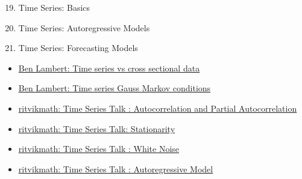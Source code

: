 \documentclass[12pt, titlepage, french]{report}
\begin{document}
\begin{ASM_chapter}
\begin{enumerate}
  \setcounter{enumi}{18}
	\item	Time Series: Basics
	\item	Time Series: Autoregressive Models
	\item	Time Series: Forecasting Models
\end{enumerate}
\end{ASM_chapter}

\begin{YTB_vids}
\begin{itemize}
	\item	\href{https://www.youtube.com/watch?v=-gmlyRRscXo}{Ben Lambert: Time series vs cross sectional data}
	\item	\href{https://www.youtube.com/watch?v=bWo_ka37szw&list=PLvo9ZnEQG5oXC-cg8ecXr6SJZWprEL1UC&index=3}{Ben Lambert: Time series Gauss Markov conditions}
	\item	\href{https://www.youtube.com/watch?v=DeORzP0go5I&list=PLvcbYUQ5t0UHOLnBzl46_Q6QKtFgfMGc3&index=14}{ritvikmath: Time Series Talk : Autocorrelation and Partial Autocorrelation}
	\item	\href{https://www.youtube.com/watch?v=oY-j2Wof51c&list=PLvcbYUQ5t0UHOLnBzl46_Q6QKtFgfMGc3&index=6}{ritvikmath: Time Series Talk: Stationarity}
	\item	\href{https://www.youtube.com/watch?v=cr4zIXAmSRI}{ritvikmath: Time Series Talk : White Noise}
	\item	\href{https://www.youtube.com/watch?v=5-2C4eO4cPQ}{ritvikmath: Time Series Talk : Autoregressive Model}

\end{itemize}
\end{YTB_vids}
\end{document}
